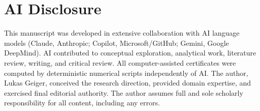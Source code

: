\documentclass[12pt,a4paper]{article}
\theoremstyle{definition}
\theoremstyle{remark}
\begin{document}
\section*{AI Disclosure}

This manuscript was developed in extensive collaboration with AI language models (Claude, Anthropic; Copilot, Microsoft/GitHub; Gemini, Google DeepMind). AI contributed to conceptual exploration, analytical work, literature review, writing, and critical review. All computer-assisted certificates were computed by deterministic numerical scripts independently of AI. The author, Lukas Geiger, conceived the research direction, provided domain expertise, and exercised final editorial authority. The author assumes full and sole scholarly responsibility for all content, including any errors.




\end{document}
